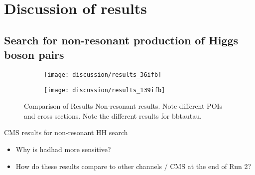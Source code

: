 \section{Discussion of results}%
\label{sec:result_discussion}



\subsection{Search for non-resonant production of Higgs boson pairs}


\begin{figure}[htbp]
  \centering

  \begin{subfigure}{0.53\textwidth}
    \texttt{[image: discussion/results\_36ifb]}
  \end{subfigure}\hfill%
  \begin{subfigure}{0.45\textwidth}
    \texttt{[image: discussion/results\_139ifb]}
  \end{subfigure}

  \caption{Comparison of
    Results
    Non-resonant results. Note different POIs and cross
    sections. Note the different results for bbtautau.}
  \label{fig:blabla}
\end{figure}


\begin{table}[htbp]
  \centering

  

  \caption{CMS results for non-resonant HH search}
  \label{tab:cms_nonresonant}
\end{table}


\begin{itemize}
\item Why is hadhad more sensitive?
\item How do these results compare to other channels / CMS at the end of Run 2?
\end{itemize}

